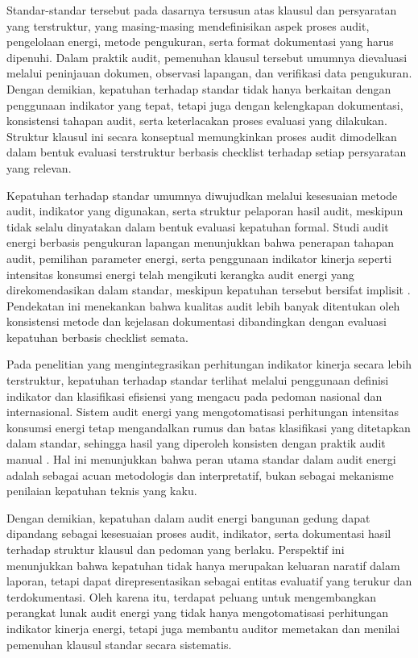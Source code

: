 Standar-standar tersebut pada dasarnya tersusun atas klausul dan persyaratan yang terstruktur, yang masing-masing mendefinisikan aspek proses audit, pengelolaan energi, metode pengukuran, serta format dokumentasi yang harus dipenuhi. Dalam praktik audit, pemenuhan klausul tersebut umumnya dievaluasi melalui peninjauan dokumen, observasi lapangan, dan verifikasi data pengukuran. Dengan demikian, kepatuhan terhadap standar tidak hanya berkaitan dengan penggunaan indikator yang tepat, tetapi juga dengan kelengkapan dokumentasi, konsistensi tahapan audit, serta keterlacakan proses evaluasi yang dilakukan. Struktur klausul ini secara konseptual memungkinkan proses audit dimodelkan dalam bentuk evaluasi terstruktur berbasis checklist terhadap setiap persyaratan yang relevan.

Kepatuhan terhadap standar umumnya diwujudkan melalui kesesuaian metode audit, indikator yang digunakan, serta struktur pelaporan hasil audit, meskipun tidak selalu dinyatakan dalam bentuk evaluasi kepatuhan formal. Studi audit energi berbasis pengukuran lapangan menunjukkan bahwa penerapan tahapan audit, pemilihan parameter energi, serta penggunaan indikator kinerja seperti intensitas konsumsi energi telah mengikuti kerangka audit energi yang direkomendasikan dalam standar, meskipun kepatuhan tersebut bersifat implisit \cite{hamdani2017audit,winarto2019audit}. Pendekatan ini menekankan bahwa kualitas audit lebih banyak ditentukan oleh konsistensi metode dan kejelasan dokumentasi dibandingkan dengan evaluasi kepatuhan berbasis checklist semata.

Pada penelitian yang mengintegrasikan perhitungan indikator kinerja secara lebih terstruktur, kepatuhan terhadap standar terlihat melalui penggunaan definisi indikator dan klasifikasi efisiensi yang mengacu pada pedoman nasional dan internasional. Sistem audit energi yang mengotomatisasi perhitungan intensitas konsumsi energi tetap mengandalkan rumus dan batas klasifikasi yang ditetapkan dalam standar, sehingga hasil yang diperoleh konsisten dengan praktik audit manual \cite{fitri2022sistem,putra2025evaluasi}. Hal ini menunjukkan bahwa peran utama standar dalam audit energi adalah sebagai acuan metodologis dan interpretatif, bukan sebagai mekanisme penilaian kepatuhan teknis yang kaku.

Dengan demikian, kepatuhan dalam audit energi bangunan gedung dapat dipandang sebagai kesesuaian proses audit, indikator, serta dokumentasi hasil terhadap struktur klausul dan pedoman yang berlaku. Perspektif ini menunjukkan bahwa kepatuhan tidak hanya merupakan keluaran naratif dalam laporan, tetapi dapat direpresentasikan sebagai entitas evaluatif yang terukur dan terdokumentasi. Oleh karena itu, terdapat peluang untuk mengembangkan perangkat lunak audit energi yang tidak hanya mengotomatisasi perhitungan indikator kinerja energi, tetapi juga membantu auditor memetakan dan menilai pemenuhan klausul standar secara sistematis.

